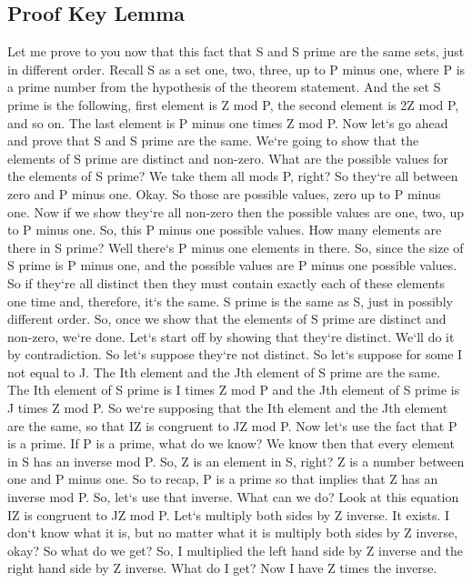 \subsection{Proof  Key Lemma}
Let me prove to you now that this fact that S and S prime are the same sets, just in different order.
Recall S as a set one, two, three, up to P minus one, where P is a prime number from the hypothesis of the theorem statement.
And the set S prime is the following, first element is Z mod P, the second element is 2Z mod P, and so on.
The last element is P minus one times Z mod P\@.
Now let`s go ahead and prove that S and S prime are the same.
We`re going to show that the elements of S prime are distinct and non-zero.
What are the possible values for the elements of S prime? We take them all mods P, right? So they`re all between zero and P minus one.
Okay.
So those are possible values, zero up to P minus one.
Now if we show they`re all non-zero then the possible values are one, two, up to P minus one.
So, this P minus one possible values.
How many elements are there in S prime? Well there`s P minus one elements in there.
So, since the size of S prime is P minus one, and the possible values are P minus one possible values.
So if they`re all distinct then they must contain exactly each of these elements one time and, therefore, it`s the same.
S prime is the same as S, just in possibly different order.
So, once we show that the elements of S prime are distinct and non-zero, we`re done.
Let`s start off by showing that they`re distinct.
We`ll do it by contradiction.
So let`s suppose they`re not distinct.
So let`s suppose for some I not equal to J\@.
The Ith element and the Jth element of S prime are the same.
The Ith element of S prime is I times Z mod P and the Jth element of S prime is J times Z mod P\@.
So we`re supposing that the Ith element and the Jth element are the same, so that IZ is congruent to JZ mod P\@.
Now let`s use the fact that P is a prime.
If P is a prime, what do we know? We know then that every element in S has an inverse mod P\@.
So, Z is an element in S, right? Z is a number between one and P minus one.
So to recap, P is a prime so that implies that Z has an inverse mod P\@.
So, let`s use that inverse.
What can we do? Look at this equation IZ is congruent to JZ mod P\@.
Let`s multiply both sides by Z inverse.
It exists.
I don`t know what it is, but no matter what it is multiply both sides by Z inverse, okay? So what do we get? So, I multiplied the left hand side by Z inverse and the right hand side by Z inverse.
What do I get? Now I have Z times the inverse.
